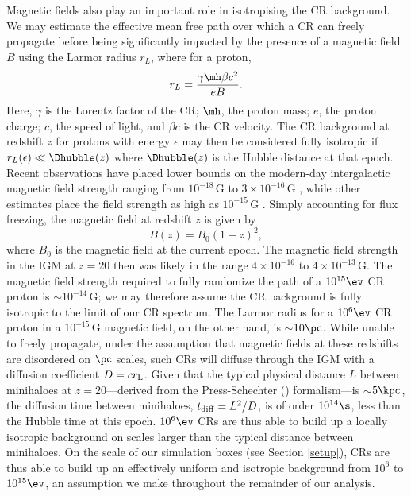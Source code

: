 Magnetic fields also play an important role in isotropising the CR background.  
We may estimate the effective mean free path over which a CR can freely propagate before being significantly impacted by the presence of a magnetic field $B$ using the Larmor radius $r_L$, where for a proton, 
\begin{equation}
r_L = \frac{\gamma \mh \beta c^2}{eB}.
\end{equation}
Here, $\gamma$ is the Lorentz factor of the CR; $\mh$, the proton mass; $e$, the proton charge; $c$, the speed of light, and $\beta c$ is the CR velocity. 
The CR background at redshift $z$ for protons with energy $\epsilon$ may then be considered fully isotropic if $r_L(\epsilon) \ll \Dhubble(z)$ where $\Dhubble(z)$ is the Hubble distance at that epoch. 
Recent observations have placed lower bounds on the modern-day intergalactic magnetic field strength ranging from $10^{-18}\,$G \citep{Dermeretal2011} to $3\times10^{-16}\,$G \citep{NeronovVovk2010}, while other estimates place the field strength as high as $10^{-15}\,$G \citep{AndoKusenko2010}.  
Simply accounting for flux freezing, the magnetic field at redshift $z$ is given by
\begin{equation}
B(z) = B_0 (1+z)^2,
\end{equation}
where $B_0$ is the magnetic field at the current epoch. 
The magnetic field strength in the IGM at $z=20$ then was likely in the range $4\times10^{-16}$ to $4\times10^{-13}\,$G.  
The magnetic field strength required to fully randomize the path of a $10^{15}\ev$ CR proton is $\sim$$10^{-14}\,$G; we may therefore assume the CR background is fully isotropic to the limit of our CR spectrum.  
The Larmor radius for a $10^6\ev$ CR proton in a $10^{-15}\,$G magnetic field, on the other hand, is $\sim$$10\pc$.  
While unable to freely propagate, under the assumption that magnetic fields at these redshifts are disordered on $\pc$ scales, such CRs will diffuse through the IGM with a diffusion coefficient $D = c r_{\rm L}$.  
Given that the typical physical distance $L$ between minihaloes at $z=20$---derived from the Press-Schechter (\citeyear{PressSchechter1974}) formalism---is $\sim$$5\kpc$, the diffusion time between minihaloes, $t_{\rm diff} = L^2/D$, is of order $10^{14}\s$, less than the Hubble time at this epoch.
$10^6\ev$ CRs are thus able to build up a locally isotropic background on scales larger than the typical distance between minihaloes.
On the scale of our simulation boxes (see Section \ref{setup}), CRs are thus able to build up an effectively uniform and isotropic background from $10^6$ to $10^{15}\ev$, an assumption we make throughout the remainder of our analysis.

